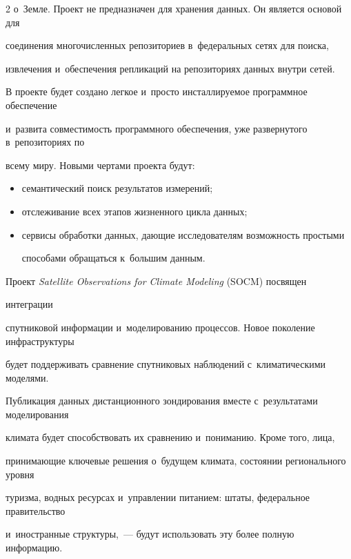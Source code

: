 \begin{multicols}{2}
о~Земле. Проект не предназначен для хранения данных. Он является основой для 


соединения многочисленных репозиториев в~федеральных сетях для поиска, 


извлечения и~обеспечения репликаций на репозиториях данных внутри сетей. 


  


  В проекте будет создано легкое и~просто инсталлируемое программное обеспечение 


и~развита совместимость программного обеспечения, уже развернутого в~репозиториях по 


всему миру. Новыми чертами проекта будут:


  \begin{itemize}


\item семантический поиск результатов измерений;


\item отслеживание всех этапов жизненного цикла данных;


\item сервисы обработки данных, дающие исследователям возможность простыми 


способами обращаться к~большим данным.


\end{itemize}





  Проект \textit{Satellite Observations for Climate Modeling} (SOCM) посвящен 


  интеграции 


спутниковой информации и~моделированию процессов. Новое поколение инфраструктуры 


будет поддерживать сравнение спутниковых наблюдений с~климатическими моделями. 


Публикация данных дистанционного зондирования вместе с~результатами моделирования 


климата будет способствовать их сравнению и~пониманию. Кроме того, лица, 


принимающие ключевые решения о~будущем климата, состоянии регионального уровня 


туризма, водных ресурсах и~управлении питанием: штаты, федеральное правительство 


и~иностранные структуры,~--- будут использовать эту более полную информацию. 



\end{multicols}
